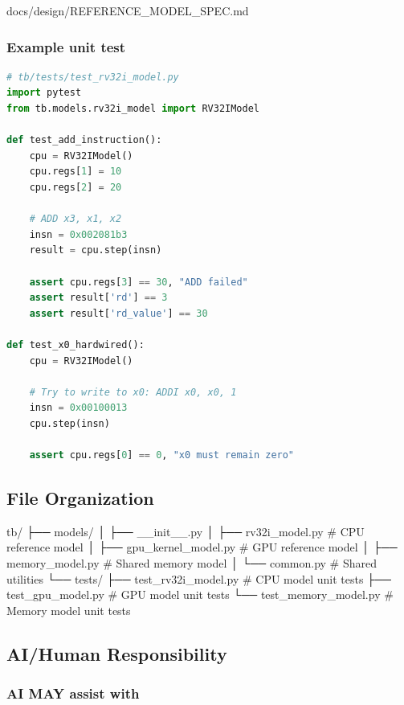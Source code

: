 \begin{relocated}{docs/design/REFERENCE_MODEL_SPEC.md}
\subsubsection{Example unit test}\label{ds:ch:reference-model:example-unit-test}

\begin{lstlisting}[language=Python]
# tb/tests/test_rv32i_model.py
import pytest
from tb.models.rv32i_model import RV32IModel

def test_add_instruction():
    cpu = RV32IModel()
    cpu.regs[1] = 10
    cpu.regs[2] = 20

    # ADD x3, x1, x2
    insn = 0x002081b3
    result = cpu.step(insn)

    assert cpu.regs[3] == 30, "ADD failed"
    assert result['rd'] == 3
    assert result['rd_value'] == 30

def test_x0_hardwired():
    cpu = RV32IModel()

    # Try to write to x0: ADDI x0, x0, 1
    insn = 0x00100013
    cpu.step(insn)

    assert cpu.regs[0] == 0, "x0 must remain zero"
\end{lstlisting}

\subsection{File Organization}\label{ds:ch:reference-model:file-organization}

\begin{textblock}
tb/
├── models/
│   ├── __init__.py
│   ├── rv32i_model.py          # CPU reference model
│   ├── gpu_kernel_model.py     # GPU reference model
│   ├── memory_model.py         # Shared memory model
│   └── common.py               # Shared utilities
└── tests/
    ├── test_rv32i_model.py     # CPU model unit tests
    ├── test_gpu_model.py       # GPU model unit tests
    └── test_memory_model.py    # Memory model unit tests
\end{textblock}

\subsection{AI/Human Responsibility}\label{ds:ch:reference-model:aihuman-responsibility}

\subsubsection{AI MAY assist with}\label{ds:ch:reference-model:ai-may-assist-with}


\end{relocated}
